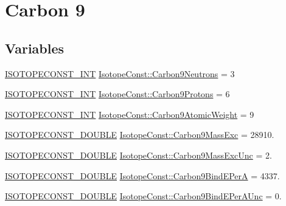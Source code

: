 \hypertarget{group___isotope_const-_carbon-_c9}{}\section{Carbon 9}
\label{group___isotope_const-_carbon-_c9}
\subsection*{Variables}
\begin{DoxyCompactItemize}
\item 
\mbox{\hyperlink{group___isotope_const-_macros_ga5f18360b3e99483a35c32d789e62621c}{I\+S\+O\+T\+O\+P\+E\+C\+O\+N\+S\+T\+\_\+\+I\+NT}} \mbox{\hyperlink{group___isotope_const-_carbon-_c9_ga68b84554337af6d700447c4e2be9c167}{Isotope\+Const\+::\+Carbon9\+Neutrons}} = 3
\item 
\mbox{\hyperlink{group___isotope_const-_macros_ga5f18360b3e99483a35c32d789e62621c}{I\+S\+O\+T\+O\+P\+E\+C\+O\+N\+S\+T\+\_\+\+I\+NT}} \mbox{\hyperlink{group___isotope_const-_carbon-_c9_ga6a5f0225f423111762ac975a0634154b}{Isotope\+Const\+::\+Carbon9\+Protons}} = 6
\item 
\mbox{\hyperlink{group___isotope_const-_macros_ga5f18360b3e99483a35c32d789e62621c}{I\+S\+O\+T\+O\+P\+E\+C\+O\+N\+S\+T\+\_\+\+I\+NT}} \mbox{\hyperlink{group___isotope_const-_carbon-_c9_gaf679b6e4e8a4561332f392b3e13b64df}{Isotope\+Const\+::\+Carbon9\+Atomic\+Weight}} = 9
\item 
\mbox{\hyperlink{group___isotope_const-_macros_ga8f45a7272ce02c0b4c65c44636ed719a}{I\+S\+O\+T\+O\+P\+E\+C\+O\+N\+S\+T\+\_\+\+D\+O\+U\+B\+LE}} \mbox{\hyperlink{group___isotope_const-_carbon-_c9_gab1692a19920785f50ffdf3cc7f0b74a8}{Isotope\+Const\+::\+Carbon9\+Mass\+Exc}} = 28910.
\item 
\mbox{\hyperlink{group___isotope_const-_macros_ga8f45a7272ce02c0b4c65c44636ed719a}{I\+S\+O\+T\+O\+P\+E\+C\+O\+N\+S\+T\+\_\+\+D\+O\+U\+B\+LE}} \mbox{\hyperlink{group___isotope_const-_carbon-_c9_ga147912d001a6ab929bc0d99f0368f4de}{Isotope\+Const\+::\+Carbon9\+Mass\+Exc\+Unc}} = 2.
\item 
\mbox{\hyperlink{group___isotope_const-_macros_ga8f45a7272ce02c0b4c65c44636ed719a}{I\+S\+O\+T\+O\+P\+E\+C\+O\+N\+S\+T\+\_\+\+D\+O\+U\+B\+LE}} \mbox{\hyperlink{group___isotope_const-_carbon-_c9_ga15366614931387fd42b135351daef681}{Isotope\+Const\+::\+Carbon9\+Bind\+E\+PerA}} = 4337.
\item 
\mbox{\hyperlink{group___isotope_const-_macros_ga8f45a7272ce02c0b4c65c44636ed719a}{I\+S\+O\+T\+O\+P\+E\+C\+O\+N\+S\+T\+\_\+\+D\+O\+U\+B\+LE}} \mbox{\hyperlink{group___isotope_const-_carbon-_c9_gafd4f330da6670a2e3c04c15772e37b12}{Isotope\+Const\+::\+Carbon9\+Bind\+E\+Per\+A\+Unc}} = 0.

\end{DoxyCompactItemize}
